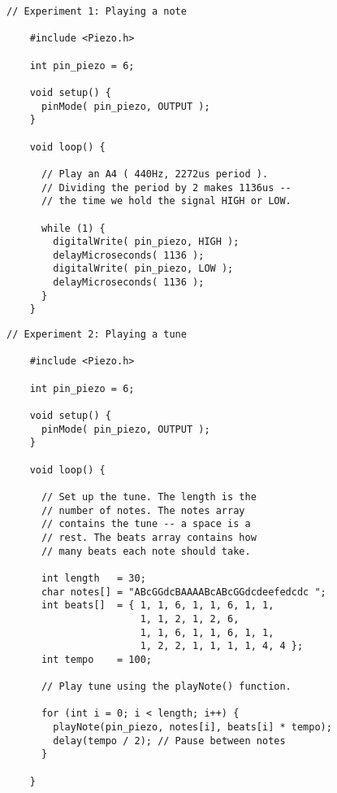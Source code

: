 \begin{minipage}[t]{0.49\tw}
  \vspace{0.1in}
  \begin{Verbatim}[gobble=3,fontsize=\small]
    // Experiment 1: Playing a note

    #include <Piezo.h>

    int pin_piezo = 6;

    void setup() {
      pinMode( pin_piezo, OUTPUT );
    }

    void loop() {

      // Play an A4 ( 440Hz, 2272us period ).
      // Dividing the period by 2 makes 1136us --
      // the time we hold the signal HIGH or LOW.

      while (1) {
        digitalWrite( pin_piezo, HIGH );
        delayMicroseconds( 1136 );
        digitalWrite( pin_piezo, LOW );
        delayMicroseconds( 1136 );
      }
    }
  \end{Verbatim}
  \vspace{0.1in}
  \begin{Verbatim}[gobble=3,fontsize=\small]
    // Experiment 2: Playing a tune

    #include <Piezo.h>

    int pin_piezo = 6;

    void setup() {
      pinMode( pin_piezo, OUTPUT );
    }

    void loop() {

      // Set up the tune. The length is the
      // number of notes. The notes array
      // contains the tune -- a space is a
      // rest. The beats array contains how
      // many beats each note should take.

      int length   = 30;
      char notes[] = "ABcGGdcBAAAABcABcGGdcdeefedcdc ";
      int beats[]  = { 1, 1, 6, 1, 1, 6, 1, 1,
                       1, 1, 2, 1, 2, 6,
                       1, 1, 6, 1, 1, 6, 1, 1,
                       1, 2, 2, 1, 1, 1, 1, 4, 4 };
      int tempo    = 100;

      // Play tune using the playNote() function.

      for (int i = 0; i < length; i++) {
        playNote(pin_piezo, notes[i], beats[i] * tempo);
        delay(tempo / 2); // Pause between notes
      }

    }
  \end{Verbatim}
\end{minipage}
\vspace{0.1in}


